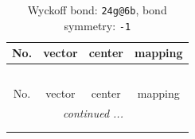\documentclass[fleqn,8pt]{jsarticle}
\begin{document}
\renewcommand{\arraystretch}{1.2}
\begin{longtable}{cccc}
\caption{Wyckoff bond: {\tt 24g@6b}, bond symmetry: {\tt -1}}
 \\
 \hline \hline
No. & vector & center & mapping \\ \hline \endfirsthead

\multicolumn{3}{l}{\tablename\ \thetable{}} \\
 \hline \hline
No. & vector & center & mapping \\ \hline \endhead

 \hline \hline
\multicolumn{3}{r}{\footnotesize\it continued ...} \\ \endfoot

 \hline \hline
\multicolumn{3}{r}{} \\ \endlastfoot


\end{longtable}
\end{document}
